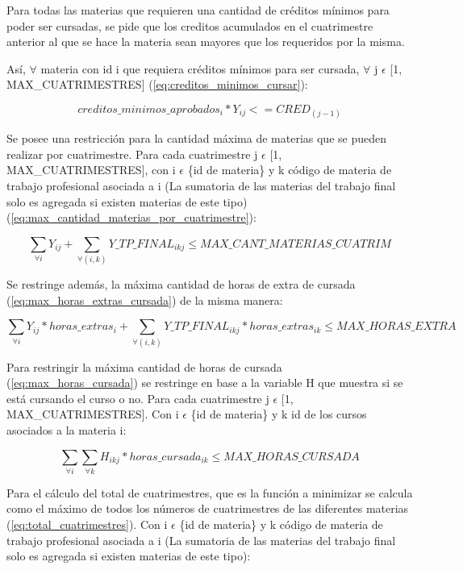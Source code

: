 \documentclass[a4paper]{article}
\begin{document}
Para todas las materias que requieren una cantidad de créditos mínimos para poder ser cursadas, se pide que los creditos acumulados en el cuatrimestre anterior al que se hace la materia sean mayores que los requeridos por la misma.

Así, $\forall$ materia con id i que requiera créditos mínimos para ser cursada, $\forall$ j $\epsilon$ [1, MAX\_CUATRIMESTRES] (\ref{eq:creditos_minimos_cursar}):

\begin{equation}\label{eq:creditos_minimos_cursar}
creditos\_minimos\_aprobados_i * Y_{ij} <= CRED_{(j-1)}
\end{equation}

Se posee una restricción para la cantidad máxima de materias que se pueden realizar por cuatrimestre. Para cada cuatrimestre j $\epsilon$ [1, MAX\_CUATRIMESTRES], con i $\epsilon$ \{id de materia\} y k código de materia de trabajo profesional asociada a i (La sumatoria de las materias del trabajo final solo es agregada si existen materias de este tipo) (\ref{eq:max_cantidad_materias_por_cuatrimestre}):

\begin{equation}\label{eq:max_cantidad_materias_por_cuatrimestre}
\sum_{\forall i} Y_{ij} + \sum_{\forall (i,k)} Y\_TP\_FINAL_{ikj} \leq MAX\_CANT\_MATERIAS\_CUATRIM
\end{equation}

Se restringe además, la máxima cantidad de horas de extra de cursada (\ref{eq:max_horas_extras_cursada}) de la misma manera:

\begin{equation}\label{eq:max_horas_extras_cursada}
\sum_{\forall i} Y_{ij} * horas\_extras_i + \sum_{\forall (i,k)} Y\_TP\_FINAL_{ikj} * horas\_extras_{ik} \leq MAX\_HORAS\_EXTRA
\end{equation}

Para restringir la máxima cantidad de horas de cursada (\ref{eq:max_horas_cursada}) se restringe en base a la variable H que muestra si se está cursando el curso o no. Para cada cuatrimestre j $\epsilon$ [1, MAX\_CUATRIMESTRES]. Con i $\epsilon$ \{id de materia\} y k id de los cursos asociados a la materia i:

\begin{equation}\label{eq:max_horas_cursada}
\sum_{\forall i} \sum_{\forall k} H_{ikj} * horas\_cursada_{ik} \leq MAX\_HORAS\_CURSADA
\end{equation}

Para el cálculo del total de cuatrimestres, que es la función a minimizar se calcula como el máximo de todos los números de cuatrimestres de las diferentes materias (\ref{eq:total_cuatrimestres}). Con i $\epsilon$ \{id de materia\} y k código de materia de trabajo profesional asociada a i (La sumatoria de las materias del trabajo final solo es agregada si existen materias de este tipo):
\end{document}
